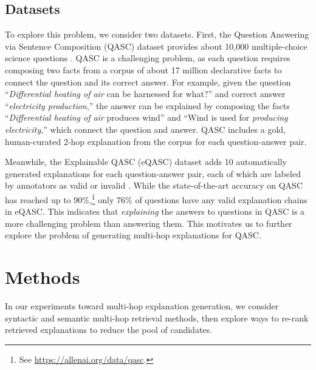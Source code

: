 \documentclass[letterpaper]{article} %
\begin{document}
\subsection{Datasets}
To explore this problem, we consider two datasets. First, the Question Answering via Sentence Composition (QASC) dataset provides about 10,000 multiple-choice science questions \cite{khot2020qasc}. QASC is a challenging problem, as each question requires composing two facts from a corpus of about 17 million declarative facts to connect the question and its correct answer. 
For example, given the question ``\textit{Differential heating of air} can be harnessed for what?'' and correct answer ``\textit{electricity production},'' the answer can be explained by composing the facts ``\textit{Differential heating of air} produces wind'' and ``Wind is used for \textit{producing electricity},'' which connect the question and answer.
QASC includes a gold, human-curated 2-hop explanation from the corpus for each question-answer pair.

Meanwhile, the Explainable QASC (eQASC) dataset adds 10 automatically generated explanations for each question-answer pair, each of which are labeled by annotators as valid or invalid \cite{jhamtani-clark-2020-learning}. 
While the state-of-the-art accuracy on QASC has reached up to 90\%,\footnote{See \url{https://allenai.org/data/qasc}.} only 76\% of questions have any valid explanation chains in eQASC. This indicates that \textit{explaining} the answers to questions in QASC is a more challenging problem than answering them. This motivates us to further explore the problem of generating multi-hop explanations for QASC.

\section{Methods}
In our experiments toward multi-hop explanation generation, we consider syntactic and semantic multi-hop retrieval methods, then explore ways to re-rank retrieved explanations to reduce the pool of candidates.
\end{document}
